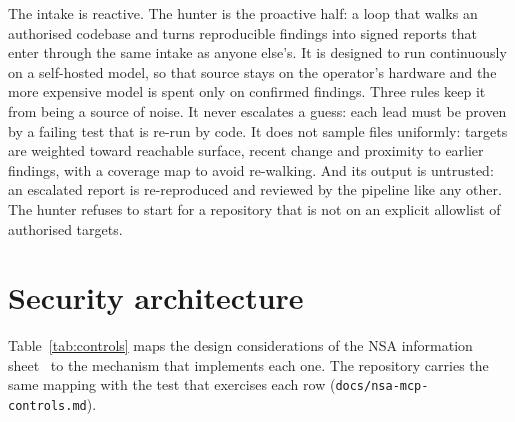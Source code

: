 \documentclass[11pt]{article}
\newcommand{\code}[1]{\texttt{\small #1}}
\begin{document}
The intake is reactive. The hunter is the proactive half: a loop that walks an authorised codebase and turns
reproducible findings into signed reports that enter through the same intake as anyone else's. It is designed to
run continuously on a self-hosted model, so that source stays on the operator's hardware and the more expensive
model is spent only on confirmed findings. Three rules keep it from being a source of noise. It never escalates
a guess: each lead must be proven by a failing test that is re-run by code. It does not sample files uniformly:
targets are weighted toward reachable surface, recent change and proximity to earlier findings, with a coverage
map to avoid re-walking. And its output is untrusted: an escalated report is re-reproduced and reviewed by the
pipeline like any other. The hunter refuses to start for a repository that is not on an explicit allowlist of
authorised targets.

\section{Security architecture}
\label{sec:security}

Table~\ref{tab:controls} maps the design considerations of the NSA information sheet~\cite{nsamcp} to the
mechanism that implements each one. The repository carries the same mapping with the test that exercises each
row (\code{docs/nsa-mcp-controls.md}).
\end{document}
